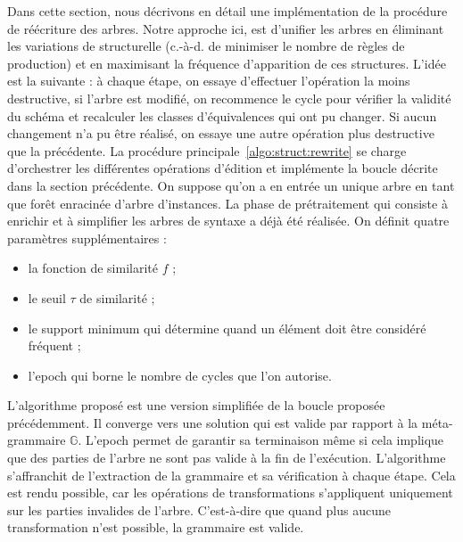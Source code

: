 


Dans cette section, nous décrivons en détail une implémentation de la procédure de réécriture des arbres.
Notre approche ici, est d'unifier les arbres en éliminant les variations de structurelle (c.-à-d. de minimiser le nombre de règles de production) et en maximisant la fréquence d'apparition de ces structures.
L'idée est la suivante : à chaque étape, on essaye d'effectuer l'opération la moins destructive, si l'arbre est modifié, on recommence le cycle pour vérifier la validité du schéma et recalculer les classes d'équivalences qui ont pu changer.
Si aucun changement n'a pu être réalisé, on essaye une autre opération plus destructive que la précédente.
La procédure principale~\ref{algo:struct:rewrite} se charge d'orchestrer les différentes opérations d'édition et implémente la boucle décrite dans la section précédente.
On suppose qu'on a en entrée un unique arbre en tant que forêt enracinée d'arbre d'instances.
La phase de prétraitement qui consiste à enrichir et à simplifier les arbres de syntaxe a déjà été réalisée.
On définit quatre paramètres supplémentaires :
\begin{itemize}
    \item la fonction de similarité $f$ ;
    \item le seuil $\tau$ de similarité ;
    \item le support minimum qui détermine quand un élément doit être considéré fréquent ;
    \item l'epoch qui borne le nombre de cycles que l'on autorise.
\end{itemize}
L'algorithme proposé est une version simplifiée de la boucle proposée précédemment.
Il converge vers une solution qui est valide par rapport à la méta-grammaire $\mathbb{G}$.
L'epoch permet de garantir sa terminaison même si cela implique que des parties de l'arbre ne sont pas valide à la fin de l'exécution.
L'algorithme s'affranchit de l'extraction de la grammaire et sa vérification à chaque étape.
Cela est rendu possible, car les opérations de transformations s'appliquent uniquement sur les parties invalides de l'arbre.
C'est-à-dire que quand plus aucune transformation n'est possible, la grammaire est valide.

